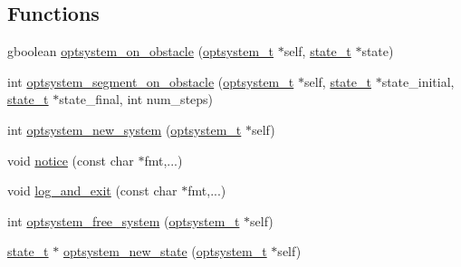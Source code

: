 \subsection*{\-Functions}
\begin{DoxyCompactItemize}
\item 
gboolean \hyperlink{a00017_a9f36fca086a6cf92613350b5b2d513a7_a9f36fca086a6cf92613350b5b2d513a7}{optsystem\-\_\-on\-\_\-obstacle} (\hyperlink{a00018_a48d08bbb4534f55ba817743a2b91360c_a48d08bbb4534f55ba817743a2b91360c}{optsystem\-\_\-t} $\ast$self, \hyperlink{a00018_a1c9d0bb39483d4981491e6383b0dbb47_a1c9d0bb39483d4981491e6383b0dbb47}{state\-\_\-t} $\ast$state)
\item 
int \hyperlink{a00017_ab593d0ccc2b4b49a7ba7a140505bdb5c_ab593d0ccc2b4b49a7ba7a140505bdb5c}{optsystem\-\_\-segment\-\_\-on\-\_\-obstacle} (\hyperlink{a00018_a48d08bbb4534f55ba817743a2b91360c_a48d08bbb4534f55ba817743a2b91360c}{optsystem\-\_\-t} $\ast$self, \hyperlink{a00018_a1c9d0bb39483d4981491e6383b0dbb47_a1c9d0bb39483d4981491e6383b0dbb47}{state\-\_\-t} $\ast$state\-\_\-initial, \hyperlink{a00018_a1c9d0bb39483d4981491e6383b0dbb47_a1c9d0bb39483d4981491e6383b0dbb47}{state\-\_\-t} $\ast$state\-\_\-final, int num\-\_\-steps)
\item 
int \hyperlink{a00017_ad37a0c28a54088a6415ad9dd85542379_ad37a0c28a54088a6415ad9dd85542379}{optsystem\-\_\-new\-\_\-system} (\hyperlink{a00018_a48d08bbb4534f55ba817743a2b91360c_a48d08bbb4534f55ba817743a2b91360c}{optsystem\-\_\-t} $\ast$self)
\item 
void \hyperlink{a00017_aa9b138e04bbc249582d169d3e3b710df_aa9b138e04bbc249582d169d3e3b710df}{notice} (const char $\ast$fmt,...)
\item 
void \hyperlink{a00017_afc84c983cb791517c5f8cdf61cd6bea0_afc84c983cb791517c5f8cdf61cd6bea0}{log\-\_\-and\-\_\-exit} (const char $\ast$fmt,...)
\item 
int \hyperlink{a00017_a1b54dac5618bcfadd941a7585239e52e_a1b54dac5618bcfadd941a7585239e52e}{optsystem\-\_\-free\-\_\-system} (\hyperlink{a00018_a48d08bbb4534f55ba817743a2b91360c_a48d08bbb4534f55ba817743a2b91360c}{optsystem\-\_\-t} $\ast$self)
\item 
\hyperlink{a00018_a1c9d0bb39483d4981491e6383b0dbb47_a1c9d0bb39483d4981491e6383b0dbb47}{state\-\_\-t} $\ast$ \hyperlink{a00017_a7eb5bfb9a16cf6e49245635fa2400465_a7eb5bfb9a16cf6e49245635fa2400465}{optsystem\-\_\-new\-\_\-state} (\hyperlink{a00018_a48d08bbb4534f55ba817743a2b91360c_a48d08bbb4534f55ba817743a2b91360c}{optsystem\-\_\-t} $\ast$self)
\item 

\end{DoxyCompactItemize}
